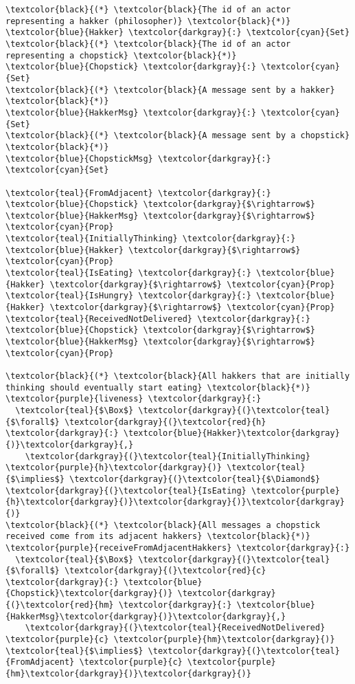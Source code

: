 \begin{Verbatim}[commandchars=\\\{\},codes={\catcode`$=3}]
\textcolor{black}{(*} \textcolor{black}{The id of an actor representing a hakker (philosopher)} \textcolor{black}{*)}
\textcolor{blue}{Hakker} \textcolor{darkgray}{:} \textcolor{cyan}{Set}
\textcolor{black}{(*} \textcolor{black}{The id of an actor representing a chopstick} \textcolor{black}{*)}
\textcolor{blue}{Chopstick} \textcolor{darkgray}{:} \textcolor{cyan}{Set}
\textcolor{black}{(*} \textcolor{black}{A message sent by a hakker} \textcolor{black}{*)}
\textcolor{blue}{HakkerMsg} \textcolor{darkgray}{:} \textcolor{cyan}{Set}
\textcolor{black}{(*} \textcolor{black}{A message sent by a chopstick} \textcolor{black}{*)}
\textcolor{blue}{ChopstickMsg} \textcolor{darkgray}{:} \textcolor{cyan}{Set}

\textcolor{teal}{FromAdjacent} \textcolor{darkgray}{:} \textcolor{blue}{Chopstick} \textcolor{darkgray}{$\rightarrow$} \textcolor{blue}{HakkerMsg} \textcolor{darkgray}{$\rightarrow$} \textcolor{cyan}{Prop}
\textcolor{teal}{InitiallyThinking} \textcolor{darkgray}{:} \textcolor{blue}{Hakker} \textcolor{darkgray}{$\rightarrow$} \textcolor{cyan}{Prop}
\textcolor{teal}{IsEating} \textcolor{darkgray}{:} \textcolor{blue}{Hakker} \textcolor{darkgray}{$\rightarrow$} \textcolor{cyan}{Prop}
\textcolor{teal}{IsHungry} \textcolor{darkgray}{:} \textcolor{blue}{Hakker} \textcolor{darkgray}{$\rightarrow$} \textcolor{cyan}{Prop}
\textcolor{teal}{ReceivedNotDelivered} \textcolor{darkgray}{:} \textcolor{blue}{Chopstick} \textcolor{darkgray}{$\rightarrow$} \textcolor{blue}{HakkerMsg} \textcolor{darkgray}{$\rightarrow$} \textcolor{cyan}{Prop}

\textcolor{black}{(*} \textcolor{black}{All hakkers that are initially thinking should eventually start eating} \textcolor{black}{*)}
\textcolor{purple}{liveness} \textcolor{darkgray}{:} 
  \textcolor{teal}{$\Box$} \textcolor{darkgray}{(}\textcolor{teal}{$\forall$} \textcolor{darkgray}{(}\textcolor{red}{h} \textcolor{darkgray}{:} \textcolor{blue}{Hakker}\textcolor{darkgray}{)}\textcolor{darkgray}{,} 
    \textcolor{darkgray}{(}\textcolor{teal}{InitiallyThinking} \textcolor{purple}{h}\textcolor{darkgray}{)} \textcolor{teal}{$\implies$} \textcolor{darkgray}{(}\textcolor{teal}{$\Diamond$} \textcolor{darkgray}{(}\textcolor{teal}{IsEating} \textcolor{purple}{h}\textcolor{darkgray}{)}\textcolor{darkgray}{)}\textcolor{darkgray}{)}
\textcolor{black}{(*} \textcolor{black}{All messages a chopstick received come from its adjacent hakkers} \textcolor{black}{*)}
\textcolor{purple}{receiveFromAdjacentHakkers} \textcolor{darkgray}{:} 
  \textcolor{teal}{$\Box$} \textcolor{darkgray}{(}\textcolor{teal}{$\forall$} \textcolor{darkgray}{(}\textcolor{red}{c} \textcolor{darkgray}{:} \textcolor{blue}{Chopstick}\textcolor{darkgray}{)} \textcolor{darkgray}{(}\textcolor{red}{hm} \textcolor{darkgray}{:} \textcolor{blue}{HakkerMsg}\textcolor{darkgray}{)}\textcolor{darkgray}{,} 
    \textcolor{darkgray}{(}\textcolor{teal}{ReceivedNotDelivered} \textcolor{purple}{c} \textcolor{purple}{hm}\textcolor{darkgray}{)} \textcolor{teal}{$\implies$} \textcolor{darkgray}{(}\textcolor{teal}{FromAdjacent} \textcolor{purple}{c} \textcolor{purple}{hm}\textcolor{darkgray}{)}\textcolor{darkgray}{)}
\end{Verbatim}
